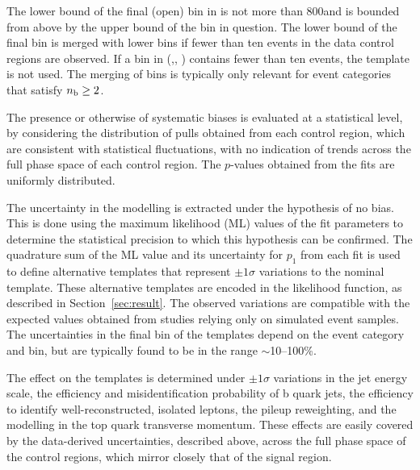 The lower bound of the final (open) bin in \HTmiss is not more than
800\GeV and is bounded from above by the upper bound of the \scalht
bin in question. The lower bound of the final \HTmiss bin is merged
with lower bins if fewer than ten events in the data control regions
are observed. If a bin in (\njet,\nb, \scalht) contains fewer than ten
events, the \HTmiss template is not used. The merging of bins is
typically only relevant for event categories that satisfy $\nb \geq
2$.

The presence or otherwise of systematic biases is evaluated at a
statistical level, by considering the distribution of pulls obtained
from each control region, which are consistent with statistical
fluctuations, with no indication of trends across the full phase space
of each control region. The $p$-values obtained from the fits are
uniformly distributed. 

The uncertainty in the \HTmiss modelling is extracted under the
hypothesis of no bias. This is done using the maximum likelihood (ML)
values of the fit parameters to determine the statistical precision to
which this hypothesis can be confirmed. The quadrature sum of the ML
value and its uncertainty for $p_1$ from each fit is used to define
alternative templates that represent $\pm1\sigma$ variations to the
nominal \HTmiss template. These alternative templates are encoded in
the likelihood function, as described in Section~\ref{sec:result}. The
observed variations are compatible with the expected values obtained
from studies relying only on simulated event samples. The
uncertainties in the final \HTmiss bin of the templates depend on the
event category and \scalht bin, but are typically found to be in the
range $\sim$10--100\%.

The effect on the \HTmiss templates is determined under $\pm1\sigma$
variations in the jet energy scale, the efficiency and
misidentification probability of b quark jets, the efficiency to
identify well-reconstructed, isolated leptons, the pileup reweighting,
and the modelling in the top quark transverse momentum. These effects
are easily covered by the data-derived uncertainties, described above,
across the full phase space of the control regions, which mirror
closely that of the signal region.





